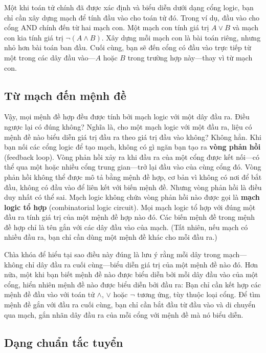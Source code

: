 Một khi toán tử chính đã được xác định và biểu diễn dưới dạng cổng logic, bạn chỉ cần xây dựng mạch để tính đầu vào cho toán tử đó. Trong ví dụ, đầu vào cho cổng AND chính đến từ hai mạch con. Một mạch con tính giá trị $A \lor B$ và mạch con kia tính giá trị $\lnot(A \land B)$. Xây dựng mỗi mạch con là bài toán riêng, nhưng nhỏ hơn bài toán ban đầu. Cuối cùng, bạn sẽ đến cổng có đầu vào trực tiếp từ một trong các dây đầu vào---$A$ hoặc $B$ trong trường hợp này---thay vì từ mạch con.

\subsection{Từ mạch đến mệnh đề}

Vậy, mọi mệnh đề hợp đều được tính bởi mạch logic với một dây đầu ra. Điều ngược lại có đúng không? Nghĩa là, cho một mạch logic với một đầu ra, liệu có mệnh đề nào biểu diễn giá trị đầu ra theo giá trị đầu vào không? Không hẳn. Khi bạn nối các cổng logic để tạo mạch, không có gì ngăn bạn tạo ra \textbf{vòng phản hồi} (feedback loop). Vòng phản hồi xảy ra khi đầu ra của một cổng được kết nối---có thể qua một hoặc nhiều cổng trung gian---trở lại đầu vào của cùng cổng đó. Vòng phản hồi không thể được mô tả bằng mệnh đề hợp, cơ bản vì không có nơi để bắt đầu, không có đầu vào để liên kết với biến mệnh đề. Nhưng vòng phản hồi là điều duy nhất có thể sai. Mạch logic không chứa vòng phản hồi nào được gọi là \textbf{mạch logic tổ hợp} (combinatorial logic circuit). Mọi mạch logic tổ hợp với đúng một đầu ra tính giá trị của một mệnh đề hợp nào đó. Các biến mệnh đề trong mệnh đề hợp chỉ là tên gắn với các dây đầu vào của mạch. (Tất nhiên, nếu mạch có nhiều đầu ra, bạn chỉ cần dùng một mệnh đề khác cho mỗi đầu ra.)

Chìa khóa để hiểu tại sao điều này đúng là lưu ý rằng mỗi dây trong mạch---không chỉ dây đầu ra cuối cùng---biểu diễn giá trị của một mệnh đề nào đó. Hơn nữa, một khi bạn biết mệnh đề nào được biểu diễn bởi mỗi dây đầu vào của một cổng, hiển nhiên mệnh đề nào được biểu diễn bởi đầu ra: Bạn chỉ cần kết hợp các mệnh đề đầu vào với toán tử $\land$, $\lor$ hoặc $\lnot$ tương ứng, tùy thuộc loại cổng. Để tìm mệnh đề gắn với đầu ra cuối cùng, bạn chỉ cần bắt đầu từ đầu vào và di chuyển qua mạch, gắn nhãn dây đầu ra của mỗi cổng với mệnh đề mà nó biểu diễn.

\subsection{Dạng chuẩn tắc tuyển}

